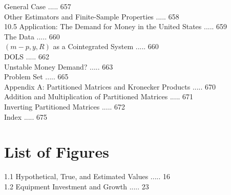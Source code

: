 \documentclass[10pt]{article}
\begin{document}
General Case ..... 657\\
Other Estimators and Finite-Sample Properties ..... 658\\
10.5 Application: The Demand for Money in the United States ..... 659\\
The Data ..... 660\\
$(m-p, y, R)$ as a Cointegrated System ..... 660\\
DOLS ..... 662\\
Unstable Money Demand? ..... 663\\
Problem Set ..... 665\\
Appendix A: Partitioned Matrices and Kronecker Products ..... 670\\
Addition and Multiplication of Partitioned Matrices ..... 671\\
Inverting Partitioned Matrices ..... 672\\
Index ..... 675

\section*{List of Figures}
1.1 Hypothetical, True, and Estimated Values ..... 16\\
1.2 Equipment Investment and Growth ..... 23
\end{document}
